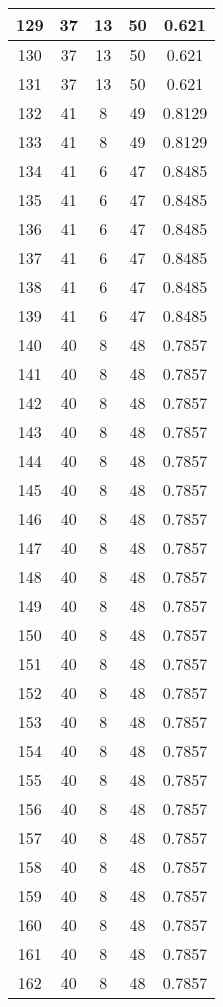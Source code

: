 \documentclass[letterpaper, 12pt]{article}
\begin{document}
\begin{longtable}{|c|c|c|c|c|}
\hline
129 & 37 & 13 & 50 & 0.621 \\
\hline
130 & 37 & 13 & 50 & 0.621 \\
\hline
131 & 37 & 13 & 50 & 0.621 \\
\hline
132 & 41 & 8 & 49 & 0.8129 \\
\hline
133 & 41 & 8 & 49 & 0.8129 \\
\hline
134 & 41 & 6 & 47 & 0.8485 \\
\hline
135 & 41 & 6 & 47 & 0.8485 \\
\hline
136 & 41 & 6 & 47 & 0.8485 \\
\hline
137 & 41 & 6 & 47 & 0.8485 \\
\hline
138 & 41 & 6 & 47 & 0.8485 \\
\hline
139 & 41 & 6 & 47 & 0.8485 \\
\hline
140 & 40 & 8 & 48 & 0.7857 \\
\hline
141 & 40 & 8 & 48 & 0.7857 \\
\hline
142 & 40 & 8 & 48 & 0.7857 \\
\hline
143 & 40 & 8 & 48 & 0.7857 \\
\hline
144 & 40 & 8 & 48 & 0.7857 \\
\hline
145 & 40 & 8 & 48 & 0.7857 \\
\hline
146 & 40 & 8 & 48 & 0.7857 \\
\hline
147 & 40 & 8 & 48 & 0.7857 \\
\hline
148 & 40 & 8 & 48 & 0.7857 \\
\hline
149 & 40 & 8 & 48 & 0.7857 \\
\hline
150 & 40 & 8 & 48 & 0.7857 \\
\hline
151 & 40 & 8 & 48 & 0.7857 \\
\hline
152 & 40 & 8 & 48 & 0.7857 \\
\hline
153 & 40 & 8 & 48 & 0.7857 \\
\hline
154 & 40 & 8 & 48 & 0.7857 \\
\hline
155 & 40 & 8 & 48 & 0.7857 \\
\hline
156 & 40 & 8 & 48 & 0.7857 \\
\hline
157 & 40 & 8 & 48 & 0.7857 \\
\hline
158 & 40 & 8 & 48 & 0.7857 \\
\hline
159 & 40 & 8 & 48 & 0.7857 \\
\hline
160 & 40 & 8 & 48 & 0.7857 \\
\hline
161 & 40 & 8 & 48 & 0.7857 \\
\hline
162 & 40 & 8 & 48 & 0.7857 \\

\end{longtable}
\end{document}
